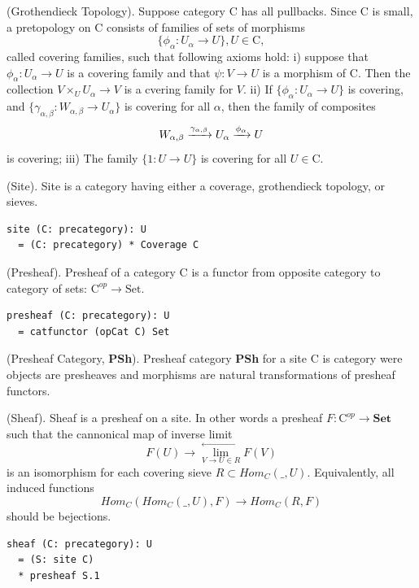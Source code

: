 \begin{definition} (Grothendieck Topology).
Suppose category $\mathrm{C}$ has all pullbacks.
Since $\mathrm{C}$ is small, a pretopology on $\mathrm{C}$ consists of families of sets of
morphisms
$$
    \{ \phi_\alpha : U_\alpha \rightarrow U \}, U \in \mathrm{C},
$$
called covering families, such that following axioms hold:
i) suppose that $\phi_\alpha : U_\alpha \rightarrow U$ is a covering family
and that $\psi : V \rightarrow U$ is a morphism of $\mathrm{C}$.
Then the collection $V \times_U U_\alpha \rightarrow V$ is a cvering family for $V$.
ii) If $\{\phi_\alpha : U_\alpha \rightarrow U \}$ is covering,
and $\{\gamma_{\alpha,\beta} : W_{\alpha,\beta} \rightarrow U_\alpha \}$
is covering for all $\alpha$, then the family of composites
$$
    W_{\alpha,\beta} \xrightarrow{{\gamma_{\alpha,\beta}}} U_\alpha \xrightarrow{{\phi_\alpha}} U
$$
is covering; iii) The family $\{1: U \rightarrow U\}$ is covering for all $U \in \mathrm{C}$.
\end{definition}

\begin{definition} (Site).
Site is a category having either a coverage, grothendieck topology, or sieves.
\begin{lstlisting}
site (C: precategory): U
  = (C: precategory) * Coverage C
\end{lstlisting}
\end{definition}

\begin{definition} (Presheaf).
Presheaf of a category $\mathrm{C}$ is a functor from opposite category to category of sets:
$\mathrm{C}^{op} \rightarrow \mathrm{Set}$.
\begin{lstlisting}
presheaf (C: precategory): U
  = catfunctor (opCat C) Set
\end{lstlisting}
\end{definition}

\begin{definition} (Presheaf Category, {\bf PSh}).
Presheaf category {\bf PSh} for a site $\mathrm{C}$ is category
were objects are presheaves and morphisms are natural transformations
of presheaf functors.
\end{definition}

\begin{definition} (Sheaf). Sheaf is a presheaf on a site. In other words
a presheaf $F : \mathrm{C}^{op} \rightarrow \mathbf{Set}$ such that the
cannonical map of inverse limit
$$
    F(U) \rightarrow \lim^{\leftarrow}_{V \to U \in R}{F(V)}
$$
is an isomorphism for each covering sieve $R \subset Hom_C(\_,U)$.
Equivalently, all induced functions
$$
    Hom_C(Hom_C(\_,U),F) \rightarrow Hom_C(R,F)
$$
should be bejections.
\begin{lstlisting}
sheaf (C: precategory): U
  = (S: site C)
  * presheaf S.1
\end{lstlisting}
\end{definition}

